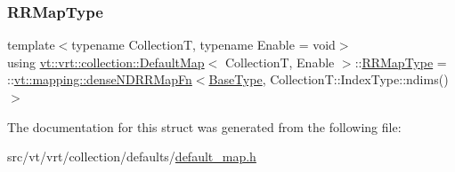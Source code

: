 \subsubsection{\texorpdfstring{R\+R\+Map\+Type}{RRMapType}}
{\footnotesize\ttfamily template$<$typename CollectionT, typename Enable = void$>$ \\
using \hyperlink{structvt_1_1vrt_1_1collection_1_1_default_map}{vt\+::vrt\+::collection\+::\+Default\+Map}$<$ CollectionT, Enable $>$\+::\hyperlink{structvt_1_1vrt_1_1collection_1_1_default_map_a4afb5c3182bf77563e5fe5226801522b}{R\+R\+Map\+Type} =  \+::\hyperlink{namespacevt_1_1mapping_af7eabd4006a3462a6ae120d52cc638a1}{vt\+::mapping\+::dense\+N\+D\+R\+R\+Map\+Fn}$<$\hyperlink{structvt_1_1vrt_1_1collection_1_1_default_map_base_a171c2e994a586fa5d8e1213f7ebfda95}{Base\+Type}, Collection\+T\+::\+Index\+Type\+::ndims()$>$}



The documentation for this struct was generated from the following file\+:\begin{DoxyCompactItemize}
\item 
src/vt/vrt/collection/defaults/\hyperlink{default__map_8h}{default\+\_\+map.\+h}\end{DoxyCompactItemize}
